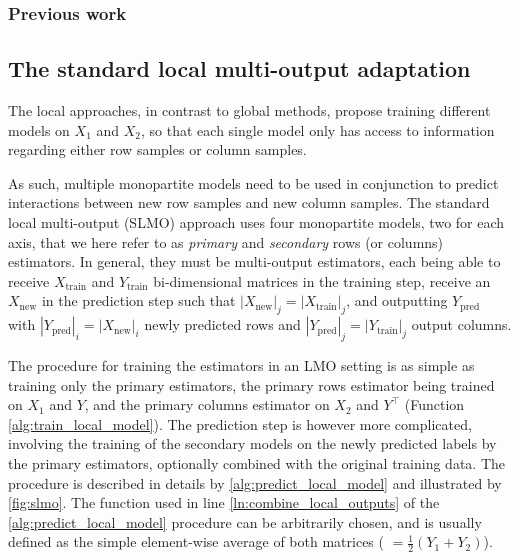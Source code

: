 
\subsubsection{Previous work}
\label{sec:sgso_previous_work}

\subsection{The standard local multi-output adaptation}
\label{sec:slmo}

The local approaches, in contrast to global methods, propose training different models on $X_1$ and $X_2$, so that each single model only has access to information regarding either row samples or column samples.

As such, multiple monopartite models need to be used in conjunction to predict interactions between new row samples and new column samples. The standard local multi-output (SLMO) approach uses four monopartite models, two for each axis, that we here refer to as \emph{primary} and \emph{secondary} rows (or columns) estimators. In general, they must be multi-output estimators, each being able to receive $X_\text{train}$ and $Y_\text{train}$ bi-dimensional matrices in the training step, receive an $X_\text{new}$ in the prediction step such that $|X_\text{new}|_j=|X_\text{train}|_j$, and outputting $Y_\text{pred}$ with $|Y_\text{pred}|_i=|X_\text{new}|_i$ newly predicted rows and $|Y_\text{pred}|_j = |Y_\text{train}|_j$ output columns.

The procedure for training the estimators in an LMO setting is as simple as training only the primary estimators, the primary rows estimator being trained on $X_1$ and $Y$, and the primary columns estimator on $X_2$ and $Y^\intercal$ (Function \ref{alg:train_local_model}). The prediction step is however more complicated, involving the training of the secondary models on the newly predicted labels by the primary estimators, optionally combined with the original training data. The procedure is described in details by \autoref{alg:predict_local_model} and illustrated by \autoref{fig:slmo}. The \KwCombine function used in line \autoref{ln:combine_local_outputs} of the \autoref{alg:predict_local_model} procedure can be arbitrarily chosen, and is usually defined as the simple element-wise average of both matrices ( $= \frac{1}{2}(Y_1 + Y_2)$).

\algTrainLocalModel
\algPredictLocalModel

